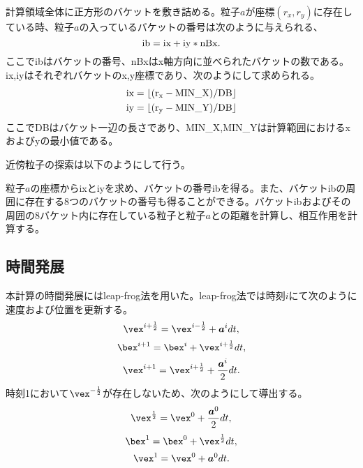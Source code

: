 \documentclass[]{jsarticle}
\begin{document}
計算領域全体に正方形のバケットを敷き詰める。粒子$a$が座標$(r_x, r_y)$に存在している時、粒子$a$の入っているバケットの番号は次のように与えられる、
\begin{equation}
\rm{ib=ix+iy*nBx}.
\end{equation}
ここでibはバケットの番号、nBxはx軸方向に並べられたバケットの数である。ix,iyはそれぞれバケットのx,y座標であり、次のようにして求められる。
\begin{equation}
\label{eqn:backet}
  \begin{split}
  \rm{ix=\lfloor(r_x-MIN\_X)/DB \rfloor}\\
  \rm{iy=\lfloor(r_y-MIN\_Y)/DB \rfloor}
\end{split}
\end{equation}
ここでDBはバケット一辺の長さであり、MIN\_X,MIN\_Yは計算範囲におけるxおよびyの最小値である。

近傍粒子の探索は以下のようにして行う。

粒子$a$の座標からixとiyを求め、バケットの番号ibを得る。また、バケットibの周囲に存在する8つのバケットの番号も得ることができる。バケットibおよびその周囲の8バケット内に存在している粒子と粒子$a$との距離を計算し、相互作用を計算する。


\subsection{時間発展}
本計算の時間発展にはleap-frog法を用いた。leap-frog法では時刻$i$にて次のように速度および位置を更新する。
\begin{equation}
  \vex^{i+\frac{1}{2}}=\vex^{i-\frac{1}{2}}+\bm{a}^idt,
\end{equation}
\begin{equation}
  \bex^{i+1}=\bex^i+\vex^{i+\frac{1}{2}}dt,
\end{equation}
\begin{equation}
  \vex^{i+1}=\vex^{i+\frac{1}{2}}+\frac{\bm{a}^i}{2}dt.
\end{equation}
時刻1において$\vex^{-\frac{1}{2}}$が存在しないため、次のようにして導出する。
\begin{equation}
  \vex^{\frac{1}{2}}=\vex^{0}+\frac{\bm{a}^0}{2}dt,
\end{equation}
\begin{equation}
  \bex^{1}=\bex^0+\vex^{\frac{1}{2}}dt,
\end{equation}
\begin{equation}
  \vex^{1}=\vex^{0}+\bm{a}^0dt.
\end{equation}
\end{document}
